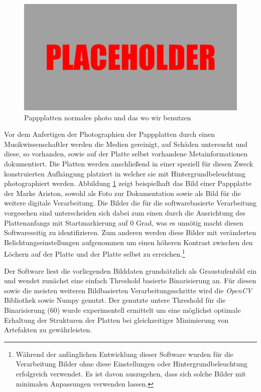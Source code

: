 \begin{figure}[t]
    \centering
    \includegraphics[width=\textwidth]{graphics/placeholder.png}
    \caption{Pappplatten normales photo und das wo wir benutzen}
    \label{pappplattenphotos}
\end{figure}

Vor dem Anfertigen der Photographien der Pappplatten durch einen Musikwissenschaftler werden die Medien gereinigt, auf Schäden untersucht und diese, so vorhanden, sowie auf der Platte selbst vorhandene Metainformationen dokumentiert.
Die Platten werden anschließend in einer speziell für diesen Zweck konstruierten Aufhängung platziert in welcher sie mit Hintergrundbeleuchtung photographiert werden.
Abbildung \ref{pappplattenphotos} zeigt beispielhaft das Bild einer Pappplatte der Marke Ariston, sowohl als Foto zur Dokumentation sowie als Bild für die weitere digitale Verarbeitung.
Die Bilder die für die softwarebasierte Verarbeitung vorgesehen sind unterscheiden sich dabei zum einen durch die Ausrichtung des Plattenanfangs mit Startmarkierung auf 0 Grad, was es unnötig macht diesen Softwareseitig zu identifizieren.
Zum anderen werden diese Bilder mit veränderten Belichtungseinstellungen aufgenommen um einen höheren Kontrast zwischen den Löchern auf der Platte und der Platte selbst zu erreichen.\footnote{Während der anfänglichen Entwicklung dieser Software wurden für die Verarbeitung Bilder ohne diese Einstellungen oder Hintergrundbeleuchtung erfolgreich verwendet. Es ist davon auszugehen, dass sich solche Bilder mit minimalen Anpassungen verwenden lassen.}

Der Software liest die vorliegenden Bilddaten grundsätzlich als Graustufenbild ein und wendet zunächst eine einfach Threshold basierte Binarisierung an.
Für diesen sowie die meisten weiteren Bildbasierten Verarbeitungsschritte wird die \textit{OpenCV} \parencite[]{opencv_library} Bibliothek sowie Numpy \parencite[]{harris2020array} genutzt.
Der genutzte untere Threshold für die Binarisierung (60) wurde experimentell ermittelt um eine möglichst optimale Erhaltung der Strukturen der Platten bei gleichzeitiger Minimierung von Artefakten zu gewährleisten.

